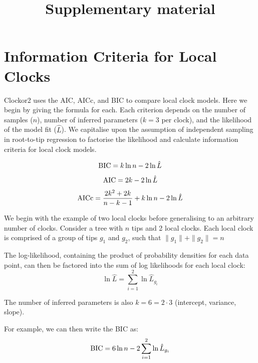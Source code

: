 \documentclass{article}
\begin{document}
\title{Supplementary material}
\maketitle
\tableofcontents
\newpage
\renewcommand{\thefigure}{S\arabic{figure}}
\setcounter{figure}{0}

\section{Information Criteria for Local Clocks}
Clockor2 uses the AIC, AICc, and BIC to compare local clock models. Here we begin by giving the formula for each. Each criterion depends on the number of samples ($n$), number of inferred parameters ($k=3$ per clock), and the likelihood of the model fit ($\hat{L}$). We capitalise upon the assumption of independent sampling in root-to-tip regression to factorise the likelihood and calculate information criteria for local clock models.

\begin{equation}
    \textnormal{BIC} = k\ln{n} - 2\ln{\hat{L}}
\end{equation}
\begin{equation}
    \textnormal{AIC} = 2k - 2\ln{\hat{L}}
\end{equation}
\begin{equation}
    \textnormal{AICc} = \frac{2k^2+2k}{n-k-1} + k\ln{n} - 2\ln{\hat{L}}
\end{equation}

We begin with the example of two local clocks before generalising to an arbitrary number of clocks. Consider a tree with $n$ tips and 2 local clocks. Each local clock is comprised of a group of tips $g_1$ and $g_2$, such that $ \|g_1\| + \|g_2\| = n $

The log-likelihood, containing the product of probability densities for each data point, can then be factored into the sum of log likelihoods for each local clock:
\begin{equation}
    \ln{\hat{L}} = \sum_{i=1}^{2} \ln{\hat{L}_{g_{i}}}
\end{equation}

The number of inferred parameters is also $k = 6 = 2\cdot3$ (intercept, variance, slope).

For example, we can then write the BIC as:
\begin{equation}
    \textnormal{BIC} = 6\ln{n} - 2\sum_{i=1}^{2} \ln{\hat{L}_{g_{i}}}
\end{equation}
\end{document}
